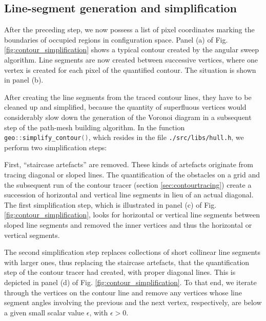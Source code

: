 \subsection{Line-segment generation and simplification}
\label{sec:line_seg_generation}
After the preceding step, we now possess a list of pixel coordinates marking the boundaries of occupied regions
in configuration space.
Panel (a) of Fig. \ref{fig:contour_simplification} shows a typical contour created by the angular sweep algorithm.
Line segments are now created between successive vertices, where one vertex is created for each pixel of the
quantified contour. The situation is shown in panel (b).

After creating the line segments from the traced contour lines, they have to be cleaned up and simplified,
because the quantity of superfluous vertices would considerably slow down the generation of the Voronoi 
diagram in a subsequent step of the path-mesh building algorithm.
In the function \lstinline[language=C++]|geo::simplify_contour()|, which resides in the file \lstinline|./src/libs/hull.h|,
we perform two simplification steps:

First, ``staircase artefacts'' are removed. These kinds of artefacts originate from tracing diagonal or sloped lines.
The quantification of the obstacles on a grid and the subsequent run of the contour tracer (section \ref{sec:contourtracing})
create a succession of horizontal and vertical line segments in lieu of an actual diagonal.
The first simplification step, which is illustrated in panel (c) of Fig. \ref{fig:contour_simplification}, looks
for horizontal or vertical line segments between sloped line segments and removed the inner vertices and thus the
horizontal or vertical segments.

The second simplification step replaces collections of short collinear line segments with larger ones,
thus replacing the staircase artefacts, that the quantification step of the contour tracer had created,
with proper diagonal lines. This is depicted in panel (d) of Fig. \ref{fig:contour_simplification}.
To that end, we iterate through the vertices on the contour line and remove any vertices whose line segment angles
involving the previous and the next vertex, respectively, are below a given small scalar value $\epsilon$, with $\epsilon > 0$.


